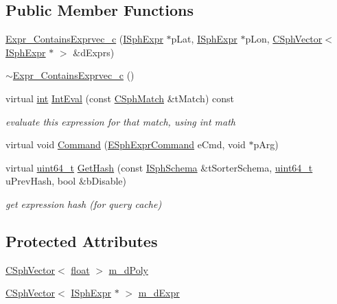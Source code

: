 \subsection*{Public Member Functions}
\begin{DoxyCompactItemize}
\item 
\hyperlink{classExpr__ContainsExprvec__c_a17dc128e4299d451427d2ec79ff549b3}{Expr\-\_\-\-Contains\-Exprvec\-\_\-c} (\hyperlink{structISphExpr}{I\-Sph\-Expr} $\ast$p\-Lat, \hyperlink{structISphExpr}{I\-Sph\-Expr} $\ast$p\-Lon, \hyperlink{classCSphVector}{C\-Sph\-Vector}$<$ \hyperlink{structISphExpr}{I\-Sph\-Expr} $\ast$ $>$ \&d\-Exprs)
\item 
\hyperlink{classExpr__ContainsExprvec__c_ac2be2c2bbb740212907fe5753238fbaf}{$\sim$\-Expr\-\_\-\-Contains\-Exprvec\-\_\-c} ()
\item 
virtual \hyperlink{sphinxexpr_8cpp_a4a26e8f9cb8b736e0c4cbf4d16de985e}{int} \hyperlink{classExpr__ContainsExprvec__c_ab56ce56a816a2e447cb84ed37d939356}{Int\-Eval} (const \hyperlink{classCSphMatch}{C\-Sph\-Match} \&t\-Match) const 
\begin{DoxyCompactList}\small\item\em evaluate this expression for that match, using int math \end{DoxyCompactList}\item 
virtual void \hyperlink{classExpr__ContainsExprvec__c_a40658b678b7b6c0110d7a576d78e6bed}{Command} (\hyperlink{sphinxexpr_8h_a30be184fb07bd80c271360fc6094c818}{E\-Sph\-Expr\-Command} e\-Cmd, void $\ast$p\-Arg)
\item 
virtual \hyperlink{sphinxstd_8h_aaa5d1cd013383c889537491c3cfd9aad}{uint64\-\_\-t} \hyperlink{classExpr__ContainsExprvec__c_add35cde2fa7efc956ccccd0b38e42141}{Get\-Hash} (const \hyperlink{classISphSchema}{I\-Sph\-Schema} \&t\-Sorter\-Schema, \hyperlink{sphinxstd_8h_aaa5d1cd013383c889537491c3cfd9aad}{uint64\-\_\-t} u\-Prev\-Hash, bool \&b\-Disable)
\begin{DoxyCompactList}\small\item\em get expression hash (for query cache) \end{DoxyCompactList}\end{DoxyCompactItemize}
\subsection*{Protected Attributes}
\begin{DoxyCompactItemize}
\item 
\hyperlink{classCSphVector}{C\-Sph\-Vector}$<$ \hyperlink{sphinxexpr_8cpp_a0e0d0739f7035f18f949c2db2c6759ec}{float} $>$ \hyperlink{classExpr__ContainsExprvec__c_ab820208bb316b48e9574d15f00e3916e}{m\-\_\-d\-Poly}
\item 
\hyperlink{classCSphVector}{C\-Sph\-Vector}$<$ \hyperlink{structISphExpr}{I\-Sph\-Expr} $\ast$ $>$ \hyperlink{classExpr__ContainsExprvec__c_a3799d27c7a599928446e51fa71bca64a}{m\-\_\-d\-Expr}
\end{DoxyCompactItemize}
